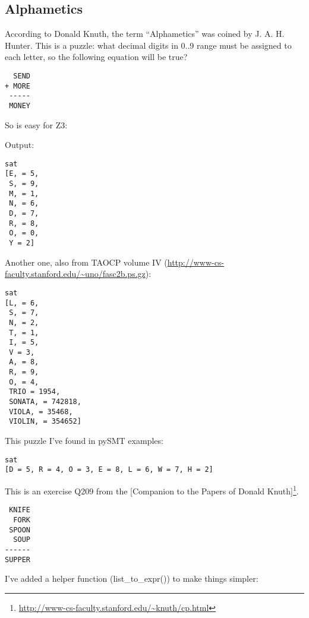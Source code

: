 \subsection{Alphametics}

According to Donald Knuth, the term ``Alphametics'' was coined by J. A. H. Hunter.
This is a puzzle: what decimal digits in 0..9 range must be assigned to each letter,
so the following equation will be true?

\begin{lstlisting}
  SEND
+ MORE
 -----
 MONEY
\end{lstlisting}

So is easy for Z3:



Output:

\begin{lstlisting}
sat
[E, = 5,
 S, = 9,
 M, = 1,
 N, = 6,
 D, = 7,
 R, = 8,
 O, = 0,
 Y = 2]
\end{lstlisting}

Another one, also from \ac{TAOCP} volume IV (\url{http://www-cs-faculty.stanford.edu/~uno/fasc2b.ps.gz}):



\begin{lstlisting}
sat
[L, = 6,
 S, = 7,
 N, = 2,
 T, = 1,
 I, = 5,
 V = 3,
 A, = 8,
 R, = 9,
 O, = 4,
 TRIO = 1954,
 SONATA, = 742818,
 VIOLA, = 35468,
 VIOLIN, = 354652]
\end{lstlisting}

This puzzle I've found in pySMT examples:



\begin{lstlisting}
sat
[D = 5, R = 4, O = 3, E = 8, L = 6, W = 7, H = 2]
\end{lstlisting}


This is an exercise Q209 from the 
[Companion to the Papers of Donald Knuth]\footnote{\url{http://www-cs-faculty.stanford.edu/~knuth/cp.html}}.

\begin{lstlisting}
 KNIFE
  FORK
 SPOON
  SOUP
------
SUPPER
\end{lstlisting}

I've added a helper function (list\_to\_expr()) to make things simpler:




